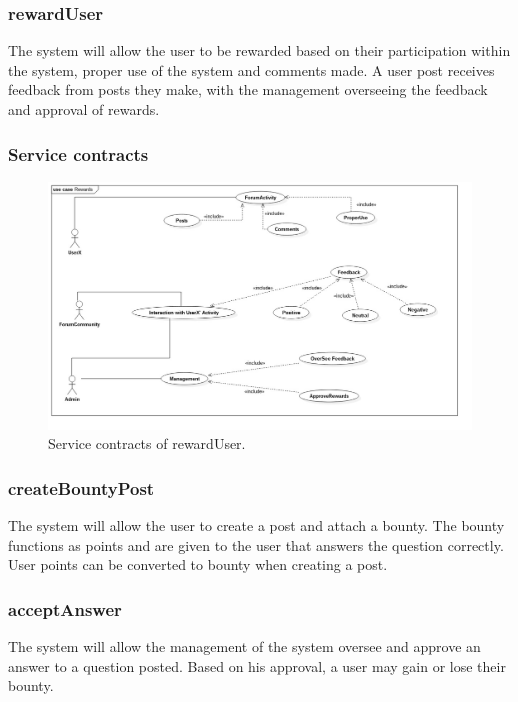 \subsubsection{rewardUser}
\par{The system will allow the user to be rewarded based on their participation within the system, proper use of the system and comments made. A user post receives feedback from posts they make, with the management overseeing the feedback and approval of rewards.}
\subsubsection{Service contracts}
\begin{figure}[h!]
\includegraphics[width=\linewidth]
{Diagrams/rewardUser.jpeg}
\caption {Service contracts of rewardUser.}
\end{figure}

\subsubsection{createBountyPost}
\par{The system will allow the user to create a post and attach a bounty. The bounty functions as points and are given to the user that answers the question correctly. User points can be converted to bounty when creating a post.}

\subsubsection{acceptAnswer}
\par{The system will allow the management of the system oversee and approve an answer to a question posted. Based on his approval, a user may gain or lose their bounty.}

